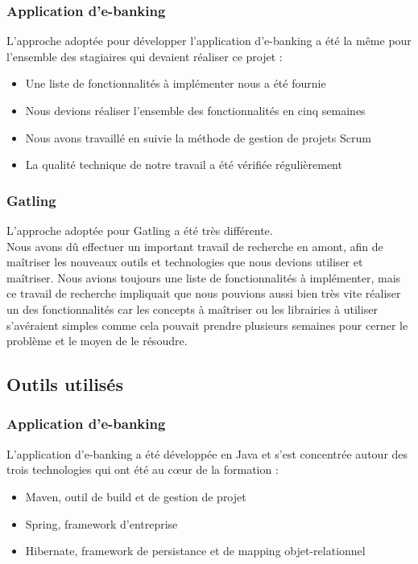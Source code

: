 \subsubsection*{Application d'e-banking}

L'approche adoptée pour développer l'application d'e-banking a été la même pour l'ensemble des stagiaires qui devaient réaliser ce projet :
\begin{itemize}
	\item Une liste de fonctionnalités à implémenter nous a été fournie
	\item Nous devions réaliser l'ensemble des fonctionnalités en cinq semaines
	\item Nous avons travaillé en suivie la méthode de gestion de projets Scrum
	\item La qualité technique de notre travail a été vérifiée régulièrement
\end{itemize}

\subsubsection*{Gatling}

L'approche adoptée pour Gatling a été très différente.\\
Nous avons dû effectuer un important travail de recherche en amont, afin de maîtriser les nouveaux outils et technologies que nous devions utiliser et maîtriser.
Nous avions toujours une liste de fonctionnalités à implémenter, mais ce travail de recherche impliquait que nous pouvions aussi bien très vite réaliser un des fonctionnalités car les concepts à maîtriser ou les librairies à utiliser s'avéraient simples comme cela pouvait prendre plusieurs semaines pour cerner le problème et le moyen de le résoudre.

\subsection{Outils utilisés}

\subsubsection*{Application d'e-banking}

L'application d'e-banking a été développée en Java et s'est concentrée autour des trois technologies qui ont été au cœur de la formation : 
\begin{itemize}
	\item Maven, outil de build et de gestion de projet
	\item Spring, framework d'entreprise
	\item Hibernate, framework de persistance et de mapping objet-relationnel
\end{itemize}

